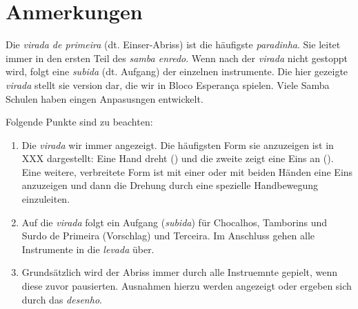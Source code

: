 \documentclass[a4paper,12pt]{bescript}
\begin{document}
\section*{Anmerkungen}
Die {\it virada de primeira} (dt. Einser-Abriss) ist die häufigste {\it paradinha}. Sie leitet immer in den ersten Teil des {\it samba enredo}. Wenn nach der {\it virada} nicht gestoppt wird, folgt eine {\it subida} (dt. Aufgang) der einzelnen instrumente.
Die hier gezeigte {\it virada} stellt sie version dar, die wir in Bloco Esperança spielen. Viele Samba Schulen haben eingen Anpasusngen entwickelt.

Folgende Punkte sind zu beachten:
\begin{enumerate}
 \item Die {\it virada} wir immer angezeigt. Die häufigsten Form sie anzuzeigen ist in XXX dargestellt: Eine Hand dreht () und die zweite zeigt eine Eins an (). Eine weitere, verbreitete Form ist mit einer oder mit beiden Händen eine Eins anzuzeigen und dann die Drehung durch eine spezielle Handbewegung einzuleiten.

 \item Auf die {\it virada} folgt ein Aufgang ({\it subida}) für Chocalhos, Tamborins und Surdo de Primeira (Vorschlag) und Terceira. Im Anschluss gehen alle Instrumente in die {\it levada} über.

 \item Grundsätzlich wird der Abriss  immer durch alle Instruemnte gepielt, wenn diese zuvor pausierten. Ausnahmen hierzu werden angezeigt oder ergeben sich durch das {\it desenho}.


\end{enumerate}
\end{document}
